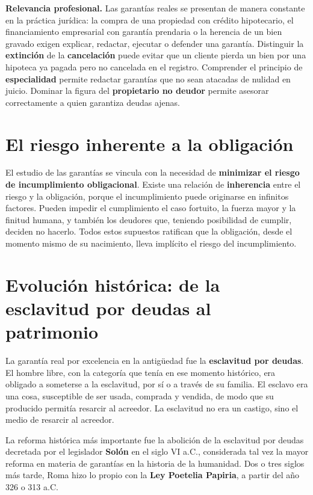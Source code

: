 \documentclass[12pt,oneside]{book}
\begin{document}
\begin{note}
\textbf{Relevancia profesional.} Las garantías reales se presentan de manera constante en la práctica jurídica: la compra de una propiedad con crédito hipotecario, el financiamiento empresarial con garantía prendaria o la herencia de un bien gravado exigen explicar, redactar, ejecutar o defender una garantía. Distinguir la \textbf{extinción} de la \textbf{cancelación} puede evitar que un cliente pierda un bien por una hipoteca ya pagada pero no cancelada en el registro. Comprender el principio de \textbf{especialidad} permite redactar garantías que no sean atacadas de nulidad en juicio. Dominar la figura del \textbf{propietario no deudor} permite asesorar correctamente a quien garantiza deudas ajenas.
\end{note}

\section{El riesgo inherente a la obligación}

El estudio de las garantías se vincula con la necesidad de \textbf{minimizar el riesgo de incumplimiento obligacional}. Existe una relación de \textbf{inherencia} entre el riesgo y la obligación, porque el incumplimiento puede originarse en infinitos factores. Pueden impedir el cumplimiento el caso fortuito, la fuerza mayor y la finitud humana, y también los deudores que, teniendo posibilidad de cumplir, deciden no hacerlo. Todos estos supuestos ratifican que la obligación, desde el momento mismo de su nacimiento, lleva implícito el riesgo del incumplimiento.

\section{Evolución histórica: de la esclavitud por deudas al patrimonio}

La garantía real por excelencia en la antigüedad fue la \textbf{esclavitud por deudas}. El hombre libre, con la categoría que tenía en ese momento histórico, era obligado a someterse a la esclavitud, por sí o a través de su familia. El esclavo era una cosa, susceptible de ser usada, comprada y vendida, de modo que su producido permitía resarcir al acreedor. La esclavitud no era un castigo, sino el medio de resarcir al acreedor.

La reforma histórica más importante fue la abolición de la esclavitud por deudas decretada por el legislador \textbf{Solón} en el siglo VI a.C., considerada tal vez la mayor reforma en materia de garantías en la historia de la humanidad. Dos o tres siglos más tarde, Roma hizo lo propio con la \textbf{Ley Poetelia Papiria}, a partir del año 326 o 313 a.C.
\end{document}
